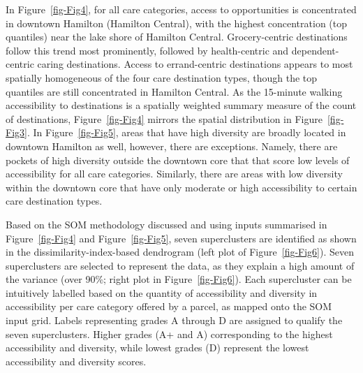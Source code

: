 \documentclass[
  authoryear,
  preprint,
  3p]{elsarticle}
\begin{document}
In Figure~\ref{fig-Fig4}, for all care categories, access to
opportunities is concentrated in downtown Hamilton (Hamilton Central),
with the highest concentration (top quantiles) near the lake shore of
Hamilton Central. Grocery-centric destinations follow this trend most
prominently, followed by health-centric and dependent-centric caring
destinations. Access to errand-centric destinations appears to most
spatially homogeneous of the four care destination types, though the top
quantiles are still concentrated in Hamilton Central. As the 15-minute
walking accessibility to destinations is a spatially weighted summary
measure of the count of destinations, Figure~\ref{fig-Fig4} mirrors the
spatial distribution in Figure~\ref{fig-Fig3}. In Figure~\ref{fig-Fig5},
areas that have high diversity are broadly located in downtown Hamilton
as well, however, there are exceptions. Namely, there are pockets of
high diversity outside the downtown core that that score low levels of
accessibility for all care categories. Similarly, there are areas with
low diversity within the downtown core that have only moderate or high
accessibility to certain care destination types.

Based on the SOM methodology discussed and using inputs summarised in
Figure~\ref{fig-Fig4} and Figure~\ref{fig-Fig5}, seven superclusters are
identified as shown in the dissimilarity-index-based dendrogram (left
plot of Figure~\ref{fig-Fig6}). Seven superclusters are selected to
represent the data, as they explain a high amount of the variance (over
90\%; right plot in Figure~\ref{fig-Fig6}). Each supercluster can be
intuitively labelled based on the quantity of accessibility and
diversity in accessibility per care category offered by a parcel, as
mapped onto the SOM input grid. Labels representing grades A through D
are assigned to qualify the seven superclusters. Higher grades (A+ and
A) corresponding to the highest accessibility and diversity, while
lowest grades (D) represent the lowest accessibility and diversity
scores.
\end{document}

